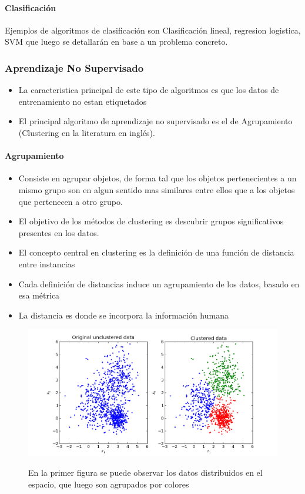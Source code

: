 \documentclass[a4paper,11pt,spanish]{book}
\begin{document}
	\paragraph {Clasificación}

	  Ejemplos de algoritmos de clasificación son Clasificación lineal, regresion logistica, SVM que luego se detallarán en base a un problema concreto.
    
      \subsubsection{Aprendizaje No Supervisado} 
	\begin{itemize}
	  \item La caracteristica principal de este tipo de algoritmos es que los datos de entrenamiento no estan etiquetados
	  \item El principal algoritmo de aprendizaje no supervisado es el de Agrupamiento (Clustering en la literatura en inglés).
	\end{itemize}
	\paragraph {Agrupamiento}
	  \begin{itemize}
	    \item Consiste en agrupar objetos, de forma tal que los objetos pertenecientes a un mismo grupo son en algun sentido mas similares entre ellos que a los objetos que pertenecen a otro grupo.
	    \item El objetivo de los métodos de clustering es descubrir grupos significativos presentes en los datos.
	    \item El concepto central en clustering es la definición de una función de distancia entre instancias
	    \item Cada definición de distancias induce un agrupamiento de los datos, basado en esa métrica
	    \item La distancia es donde se incorpora la información humana
	  \end{itemize}

	  \begin{figure}[h]
	    \includegraphics[scale=0.5]{./img/stackoverflow_clustering.png}\\
	    \caption{En la primer figura se puede observar los datos distribuidos en el espacio, que luego son agrupados por colores}
	    \label{fig:car_detection}
	  \end{figure}
\end{document}
